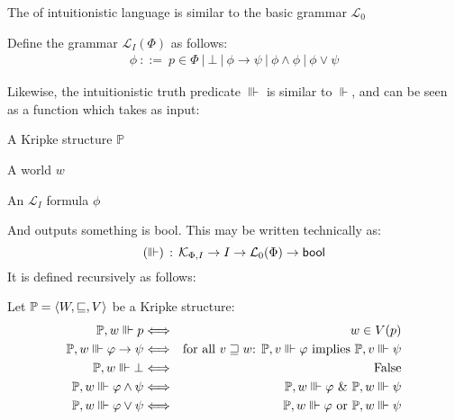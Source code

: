 The of intuitionistic language is similar to the basic grammar
$\mathcal{L}_0$

\begin{definition}
Define the grammar $\mathcal{L}_I(\Phi)$ as follows:
\begin{eqnarray*}
& \phi\ {::=} \  p \in \Phi \ |\ \bot\ |\ \phi \to \psi \
|\ \phi \wedge \phi \ |\ \phi \vee \psi &\label{LI}
\end{eqnarray*}
\end{definition}

Likewise, the intuitionistic truth predicate $\Vvdash$ is similar to
$\Vdash$, and can be seen as a function which takes as input:
\begin{bul}
  \item A Kripke structure $\mathbb{P}$
  \item A world $w$
  \item An $\mathcal{L}_I$ formula $\phi$
\end{bul}
And outputs something is \textsf{bool}.  This may be written
technically as:
\[ (\Vvdash) \colons \mathcal{K}_{\Phi, I} \to I \to
\mathcal{L}_0(\Phi) \to \text{\textsf{bool}}\]
It is defined recursively as follows:
\begin{definition}
  Let $\mathbbm{P} = \langle W, \sqsubseteq, V\rangle$ be a Kripke structure:
  \begin{eqnarray*}
    \mathbbm{P}, w \Vvdash p & \Longleftrightarrow & w \in V
    (p)\\
    \mathbbm{P}, w \Vvdash \phi \rightarrow \psi & \Longleftrightarrow &
    \textup{for all $v \sqsupseteq w$: }\mathbbm{P}, v \Vvdash \phi \text{ implies } \mathbbm{P}, v \Vvdash \psi\\
    \mathbbm{P}, w \Vvdash \bot & \Longleftrightarrow & \text{False}\\
    \mathbbm{P}, w \Vvdash \phi \wedge \psi & \Longleftrightarrow & 
\mathbbm{P}, w \Vvdash \phi  \textup{ \& } \mathbbm{P}, w \Vvdash \psi
\\
    \mathbbm{P}, w \Vvdash \phi \vee \psi & \Longleftrightarrow & 
\mathbbm{P}, w \Vvdash \phi \textup{ or } \mathbbm{P}, w \Vvdash \psi
  \end{eqnarray*}
\end{definition}

